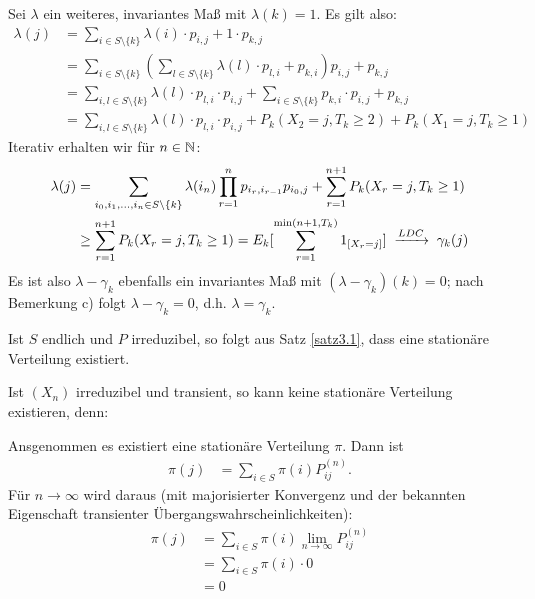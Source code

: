 \documentclass[a4paper,twoside,DIV15,BCOR12mm]{scrbook}
\begin{document}
\begin{beweis}
\begin{enuma}
\item 
  Sei $\lambda$ ein weiteres, invariantes Maß mit $\lambda(k)=1$. Es gilt also:
  \begin{align*}
    \lambda(j) &= \sum_{i \in S\setminus\{k\}} \lambda(i) \cdot p_{i,j} + 1 \cdot p_{k,j}\\
               &= \sum_{i \in S\setminus\{k\}} \left( \sum_{l \in S\setminus\{k\}} \lambda(l) \cdot p_{l,i} + p_{k,i} \right) p_{i,j} + p_{k,j}\\
               &= \sum_{i,l \in S\setminus\{k\}} \lambda(l) \cdot p_{l,i} \cdot p_{i,j} + \sum_{i \in S\setminus\{k\}} p_{k,i} \cdot p_{i,j} + p_{k,j}\\
               &= \sum_{i,l \in S\setminus\{k\}} \lambda(l) \cdot p_{l,i} \cdot p_{i,j} + P_k(X_2 = j, T_k \geq 2) + P_k(X_1 = j, T_k \geq 1)
  \end{align*}
  Iterativ erhalten wir für $n \in \mathbb{N}$:
  \begin{align*}
    \lambda(j) &= \sum_{i_0, i_1, \ldots, i_n \in S\setminus\{k\}} \lambda (i_n) \prod_{r=1}^n p_{i_r,i_{r-1}} p_{i_0,j} + \sum_{r=1}^{n+1} P_k(X_r = j, T_k \geq 1)\\
               &\geq \sum_{r=1}^{n+1} P_k(X_r = j, T_k \geq 1) = E_k[\sum_{r=1}^{\min(n+1,T_k)} 1_{[X_r = j]}] \towegen{LDC} \gamma_k(j)
  \end{align*}
  Es ist also $\lambda - \gamma_k$ ebenfalls ein invariantes Maß mit $(\lambda - \gamma_k)(k) = 0$; nach Bemerkung c) folgt
  $\lambda - \gamma_k = 0$, d.h. $\lambda = \gamma_k$.
\end{enuma}

\end{beweis}

\begin{bemerkung}
\begin{enuma}
\item Ist $S$ endlich und $P$ irreduzibel, so folgt aus Satz \ref{satz3.1}, dass eine stationäre Verteilung existiert.
\item Ist $(X_n)$ irreduzibel und transient, so kann  keine stationäre Verteilung existieren, denn:

Ansgenommen es existiert eine stationäre Verteilung $\pi$. Dann ist
\begin{align*}
\pi(j) &= \sum_{i\in S} \pi(i) P_{ij}^{(n)}.
\end{align*}
Für $n\to\infty$ wird daraus (mit majorisierter Konvergenz und der bekannten Eigenschaft transienter Übergangswahrscheinlichkeiten):
\begin{align*}
\pi(j) &= \sum_{i\in S} \pi(i) \lim_{n\to\infty} P_{ij}^{(n)} \\
&= \sum_{i\in S} \pi(i) \cdot 0 \\
&= 0
\end{align*}
\end{enuma}

\end{bemerkung}
\end{document}
